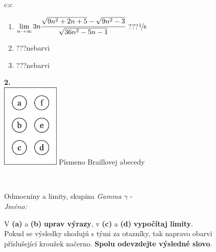 \documentclass[10pt]{report}
\begin{document}
\begin{tabular}{c:c}
\begin{minipage}[c][104.5mm][t]{0.5\linewidth}
\begin{center}
\begin{minipage}{0.79\linewidth}
\begin{center}
\begin{varwidth}{\linewidth}
\begin{enumerate}
\item $\lim\limits_{n\to\infty}3n\cfrac{\sqrt{9n^2+2n+5}-\sqrt{9n^2-3}}{\sqrt{36n^2-5n-1}}$\quad \dotfill\; ???\;\dotfill \quad $\nicefrac{1}{6}$
\item \quad \dotfill\; ???\;\dotfill \quad nebarvi
\item \quad \dotfill\; ???\;\dotfill \quad nebarvi
\end{enumerate}
\end{varwidth}
\end{center}
\end{minipage}
\begin{minipage}{0.20\linewidth}
\begin{center}
{\Huge\bfseries 2.} \\[2mm]
\includegraphics[height=40mm]{../images/braille.png}
{\small Písmeno Braillovej abecedy}
\end{center}
\end{minipage}
\end{center}
\end{minipage}
\\ \hdashline
\begin{minipage}[c][104.5mm][t]{0.5\linewidth}
\begin{center}
\vspace{7mm}
{\huge Odmocniny a limity, skupina \textit{Gamma $\gamma$} -}\\[5mm]
\textit{Jméno:}\phantom{xxxxxxxxxxxxxxxxxxxxxxxxxxxxxxxxxxxxxxxxxxxxxxxxxxxxxxxxxxxxxxxxx}\\[5mm]
\begin{minipage}{0.95\linewidth}
\begin{center}
V \textbf{(a)} a \textbf{(b)} \textbf{uprav výrazy}, v \textbf{(c)} a \textbf{(d)} \textbf{vypočítaj limity}.\\Pokud se výsledky shodujú s tými za otazníky, tak napravo obarvi\\příslušející kroužek načerno. \textbf{Spolu odevzdejte výsledné slovo}.
\end{center}
\end{minipage}
\\[1mm]

\end{center}
\end{minipage}
\end{tabular}
\end{document}
